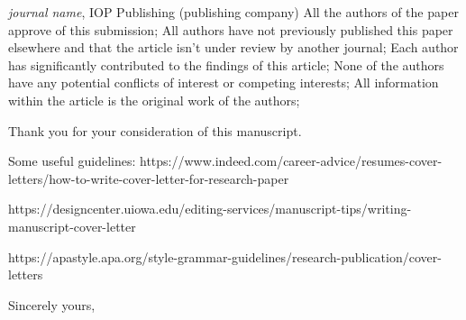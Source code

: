 \documentclass[12pt]{OUCletter}
\begin{document}
\begin{letter}{
			\textit{journal name}, IOP Publishing (publishing company)
		}
		All the authors of the paper approve of this submission;
		All authors have not previously published this paper elsewhere and that the article isn't under review by another journal;		
		Each author has significantly contributed to the findings of this article;
		None of the authors have any potential conflicts of interest or competing interests;
		All information within the article is the original work of the authors;
	
	
		
		Thank you for your consideration of this manuscript. 
	
	
  		Some useful guidelines:
  		https://www.indeed.com/career-advice/resumes-cover-letters/how-to-write-cover-letter-for-research-paper
  		
  		https://designcenter.uiowa.edu/editing-services/manuscript-tips/writing-manuscript-cover-letter
  		
  		https://apastyle.apa.org/style-grammar-guidelines/research-publication/cover-letters
		
		\closing{Sincerely yours,}
		
		
		
		
	\end{letter}
	
\end{document}
